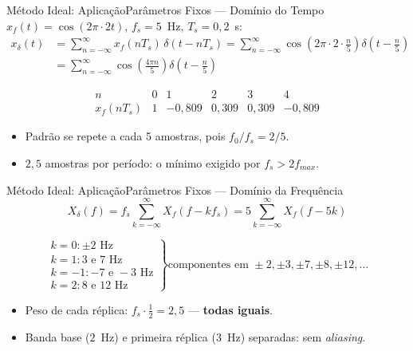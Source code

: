 \begin{frame}{Método Ideal: Aplicação}{Parâmetros Fixos --- Domínio do Tempo}
    \small
    $x_f(t) = \cos(2\pi \cdot 2t)$, \; $f_s = 5$~Hz, \; $T_s = 0,2$~s:
    \begin{align*}
        x_\delta(t) &= \sum_{n=-\infty}^{\infty} x_f(nT_s)\, \delta(t - nT_s)
        = \sum_{n=-\infty}^{\infty} \cos\!\left(2\pi \cdot 2 \cdot \frac{n}{5}\right) \delta\!\left(t - \frac{n}{5}\right)\\
        &= \sum_{n=-\infty}^{\infty} \cos\!\left(\frac{4\pi n}{5}\right) \delta\!\left(t - \frac{n}{5}\right)
    \end{align*}

    \[
        \begin{array}{c|ccccc}
            n & 0 & 1 & 2 & 3 & 4 \\ \hline
            x_f(nT_s) & 1 & -0{,}809 & 0{,}309 & 0{,}309 & -0{,}809
        \end{array}
    \]

    \begin{itemize}
      \item Padrão se repete a cada 5 amostras, pois $f_0/f_s = 2/5$.
      \item $2{,}5$ amostras por período: o mínimo exigido por $f_s > 2f_{max}$.
    \end{itemize}
\end{frame}

\begin{frame}{Método Ideal: Aplicação}{Parâmetros Fixos --- Domínio da Frequência}
    \small
    $$X_\delta(f) = f_s \sum_{k=-\infty}^{\infty} X_f(f - k f_s) = 5 \sum_{k=-\infty}^{\infty} X_f(f - 5k)$$

    $$
    \left.\begin{matrix}
    k=0: \pm 2\text{ Hz} \\
    k=1: 3 \text{ e } 7\text{ Hz} \\
    k=-1: -7 \text{ e } -3\text{ Hz} \\
    k=2: 8 \text{ e } 12\text{ Hz}
    \end{matrix}\right\} \text{componentes em } \pm 2, \pm 3, \pm 7, \pm 8, \pm 12, \dots
    $$

    \begin{itemize}
      \item Peso de cada réplica: $f_s \cdot \tfrac{1}{2} = 2{,}5$ --- \textbf{todas iguais}.
      \item Banda base ($2$~Hz) e primeira réplica ($3$~Hz) separadas: sem
            \textit{aliasing}.
    \end{itemize}
\end{frame}


